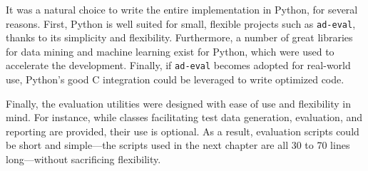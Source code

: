 It was a natural choice to write the entire implementation in Python, for several reasons. First, Python is well suited for small, flexible projects such as \texttt{ad-eval}, thanks to its simplicity and flexibility. Furthermore, a number of great libraries for data mining and machine learning exist for Python, which were used to accelerate the development. Finally, if \texttt{ad-eval} becomes adopted for real-world use, Python's good C integration could be leveraged to write optimized code. 

Finally, the evaluation utilities were designed with ease of use and flexibility in mind. For instance, while classes facilitating test data generation, evaluation, and reporting are provided, their use is optional. As a result, evaluation scripts could be short and simple---the scripts used in the next chapter are all 30 to 70 lines long---without sacrificing flexibility.

